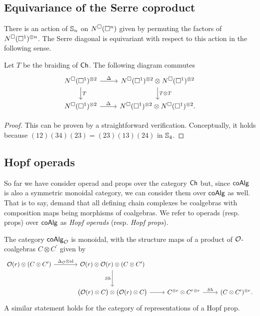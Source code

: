 \subsection{Equivariance of the Serre coproduct}
There is an action of $\S_n$ on $\cchains(\square^n)$ given by permuting the factors of $\cchains(\square^1)^{\otimes n}$.
The Serre diagonal is equivariant with respect to this action in the following sense.

\begin{lemma} \label{l:serre diagonal invariant}
	Let $T$ be the braiding of $\Ch$.
	The following diagram commutes
	\begin{equation*}
	\begin{tikzcd}
	\cchains(\square^1)^{\otimes 2} \arrow[r, "\Delta"] \arrow[d, "T"] &
	\cchains(\square^1)^{\otimes 2} \otimes \cchains(\square^1)^{\otimes 2} \arrow[d, "T \otimes T"] \\
	\cchains(\square^1)^{\otimes 2} \arrow[r, "\Delta"] &
	\cchains(\square^1)^{\otimes 2} \otimes \cchains(\square^1)^{\otimes 2}.
	\end{tikzcd}
	\end{equation*}
\end{lemma}

\begin{proof}
	This can be proven by a straightforward verification. Conceptually, it holds because $(12)(34)(23) = (23)(13)(24)$ in $\S_4$.
\end{proof}

\subsection{Hopf operads}

So far we have consider operad and props over the category $\Ch$ but, since $\coAlg$ is also a symmetric monoidal category, we can consider them over $\coAlg$ as well.
That is to say, demand that all defining chain complexes be coalgebras with composition maps being morphisms of coalgebras.
We refer to operads (resp. props) over $\coAlg$ as \textit{Hopf operads} (resp. \textit{Hopf props}).

The category $\coAlg_\O$ is monoidal, with the structure maps of a product of $\O$-coalgebras $C \otimes C^\prime$ given by
\begin{equation*}
\begin{tikzcd} [column sep = normal, row sep=large]
\O(r) \otimes (C \otimes C^\prime) \arrow[r, "\Delta_\O \otimes \id"] &[10 pt] \O(r) \otimes \O(r) \otimes (C \otimes C^\prime) \arrow[d, "Sh"'] & & \\ &
\big(\O(r) \otimes C \big) \otimes \big( \O(r) \otimes C \big) \arrow[r] & 
C^{\otimes r} \otimes C^{\prime\, \otimes r} \arrow[r, "Sh"] &
(C \otimes C^\prime)^{\otimes r}.
\end{tikzcd}
\end{equation*}
A similar statement holds for the category of representations of a Hopf prop.

